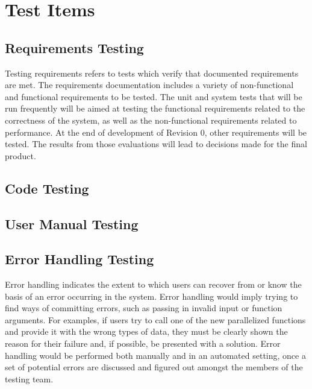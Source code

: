\documentclass[12pt]{article}
\begin{document}
\section{Test Items}

\subsection{Requirements Testing} %
Testing requirements refers to tests which verify that documented requirements are met. The requirements documentation includes a variety of non-functional and functional requirements to be tested. The unit and system tests that will be run frequently will be aimed at testing the functional requirements related to the correctness of the system, as well as the non-functional requirements related to performance. At the end of development of Revision 0, other requirements will be tested. The results from those evaluations will lead to decisions made for the final product.

\subsection{Code Testing} %

\subsection{User Manual Testing} %

\subsection{Error Handling Testing} %
Error handling indicates the extent to which users can recover from or know the basis of an error occurring in the system. Error handling would imply trying to find ways of committing errors, such as passing in invalid input or function arguments. For examples, if users try to call one of the new parallelized functions and provide it with the wrong types of data, they must be clearly shown the reason for their failure and, if possible, be presented with a solution. Error handling would be performed both manually and in an automated setting, once a set of potential errors are discussed and figured out amongst the members of the testing team.
\end{document}
